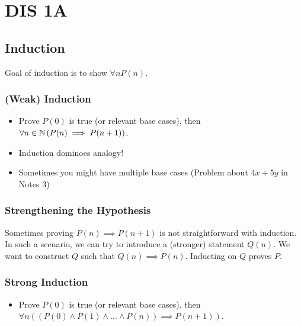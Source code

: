 \section{DIS 1A}

\subsection{Induction}
Goal of induction is to show $\forall n P(n)$. 
\subsubsection{(Weak) Induction}
\begin{itemize}
    \item Prove $P(0)$ is true (or relevant base cases), then $\forall n \in \operatorname{\mathbb{N}} \left(P(n) \implies P(n+1)\right)$. 
    \item Induction dominoes analogy! 
    \item Sometimes you might have multiple base cases (Problem about $4x+5y$ in Notes 3)
\end{itemize}

\subsubsection{Strengthening the Hypothesis}

Sometimes proving $P(n) \implies P(n+1)$ is not straightforward with induction. In such a scenario, we can try to introduce a (stronger) statement $Q(n)$. We want to construct $Q$ such that $Q(n) \implies P(n)$. Inducting on $Q$ proves $P$. 

\subsubsection{Strong Induction}
\begin{itemize}
    \item Prove $P(0)$ is true (or relevant base cases), then $\forall n \left(\left(P(0) \land P(1) \land \dots \land P(n)\right) \implies P(n+1)\right)$.   
\end{itemize}